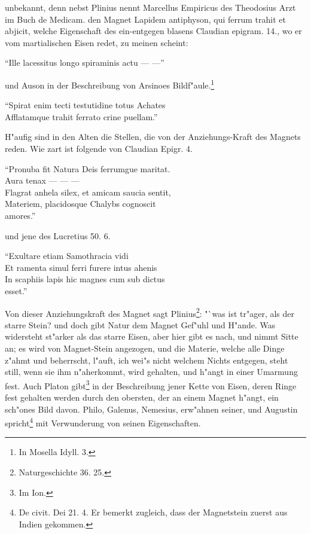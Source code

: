 \documentclass[a4paper, 11pt, oneside, polutonikogreek, german]{article}
\begin{document}
unbekannt, denn nebst Plinius nennt Marcellus Empiricus des Theodosius Arzt im Buch de Medicam. den Magnet Lapidem antiphyson, qui ferrum trahit et abjicit, welche Eigenschaft des ein-entgegen blasens Claudian epigram. 14., wo er vom martialischen Eisen redet, zu meinen scheint:

"`Ille lacessitus longo spiraminis actu --- ---"'

und Auson in der Beschreibung von Arsinoes Bildf"aule.\footnote{In Mosella Idyll. 3.}

"`Spirat enim tecti testutidine totus Achates\\
\hspace*{0.5cm} Afflatamque trahit ferrato crine puellam."'

H"aufig sind in den Alten die Stellen, die von der Anziehungs-Kraft des Magnets reden. Wie zart ist folgende von Claudian Epigr. 4.

"`Pronuba fit Natura Deis ferrumgue maritat.\\
\hspace*{0.5cm} Aura tenax --- --- ---\\
\hspace*{0.5cm} Flagrat anhela silex, et amicam saucia sentit,\\
\hspace*{0.5cm} Materiem, placidosque Chalybs cognoscit\\
\hspace*{1.5cm} amores."'

und jene des Lucretius 50. 6.

"`Exultare etiam Samothracia vidi\\
\hspace*{0.5cm} Et ramenta simul ferri furere intus ahenis\\
\hspace*{0.5cm} In scaphiis lapis hic magnes cum sub dictus\\
\hspace*{1.5cm} esset."'

Von dieser Anziehungskraft des Magnet sagt Plinius\footnote{Naturgeschichte 36. 25.}: "`was ist tr"ager, als der starre Stein? und doch gibt Natur dem Magnet Gef"uhl und H"ande. Was widersteht st"arker als das starre Eisen, aber hier gibt es nach, und nimmt Sitte an; es wird von Magnet-Stein angezogen, und die Materie, welche alle Dinge z"ahmt und beherrscht, l"auft, ich wei"s nicht welchem Nichts entgegen, steht still, wenn sie ihm n"aherkommt, wird gehalten, und h"angt in einer Umarmung fest. Auch Platon gibt\footnote{Im Ion.} in der Beschreibung jener Kette von Eisen, deren Ringe fest gehalten werden durch den obersten, der an einem Magnet h"angt, ein sch"ones Bild davon. Philo, Galenus, Nemesius, erw"ahnen seiner, und Augustin spricht\footnote{De civit. Dei 21. 4. Er bemerkt zugleich, dass der Magnetstein zuerst aus Indien gekommen.} mit Verwunderung von seinen Eigenschaften.
\end{document}
